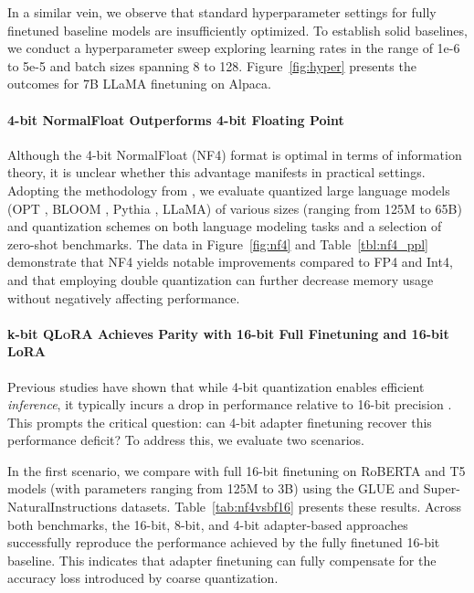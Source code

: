 In a similar vein, we observe that standard hyperparameter settings for fully finetuned baseline models are insufficiently optimized. To establish solid baselines, we conduct a hyperparameter sweep exploring learning rates in the range of 1e-6 to 5e-5 and batch sizes spanning 8 to 128. Figure~\ref{fig:hyper} presents the outcomes for 7B LLaMA finetuning on Alpaca.

\paragraph{4-bit NormalFloat Outperforms 4-bit Floating Point}

Although the 4-bit NormalFloat (NF4) format is optimal in terms of information theory, it is unclear whether this advantage manifests in practical settings. Adopting the methodology from \citet{dettmers2022case}, we evaluate quantized large language models (OPT \citep{zhang2022opt}, BLOOM \cite{scao2022bloom}, Pythia \cite{biderman2023pythia}, LLaMA) of various sizes (ranging from 125M to 65B) and quantization schemes on both language modeling tasks and a selection of zero-shot benchmarks. The data in Figure~\ref{fig:nf4} and Table~\ref{tbl:nf4_ppl} demonstrate that NF4 yields notable improvements compared to FP4 and Int4, and that employing double quantization can further decrease memory usage without negatively affecting performance.

\paragraph{k-bit \textsc{QLoRA} Achieves Parity with 16-bit Full Finetuning and 16-bit LoRA}

Previous studies have shown that while 4-bit quantization enables efficient \emph{inference}, it typically incurs a drop in performance relative to 16-bit precision \citep{dettmers2022case,frantar2022gptq}. This prompts the critical question: can 4-bit adapter finetuning recover this performance deficit? To address this, we evaluate two scenarios.

In the first scenario, we compare with full 16-bit finetuning on RoBERTA and T5 models (with parameters ranging from 125M to 3B) using the GLUE and Super-NaturalInstructions datasets. Table~\ref{tab:nf4vsbf16} presents these results. Across both benchmarks, the 16-bit, 8-bit, and 4-bit adapter-based approaches successfully reproduce the performance achieved by the fully finetuned 16-bit baseline. This indicates that adapter finetuning can fully compensate for the accuracy loss introduced by coarse quantization.

